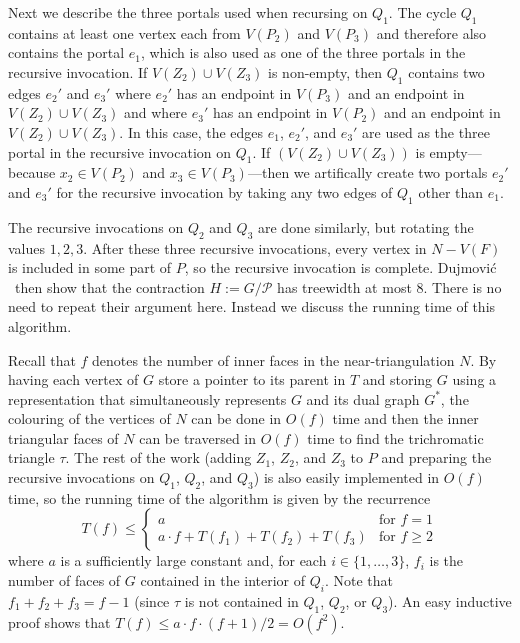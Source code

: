 \documentclass[kpfonts]{patmorin}
\let\le\leqslant
\let\ge\geqslant
\begin{document}
Next we describe the three portals used when recursing on $Q_1$.
The cycle $Q_1$ contains at least one vertex each from $V(P_2)$ and $V(P_3)$ and therefore also contains the portal $e_1$, which is also used as one of the three portals in the recursive invocation.  If $V(Z_2)\cup V(Z_3)$ is non-empty, then $Q_1$ contains two edges $e_2'$ and $e_3'$ where $e_2'$ has an endpoint in $V(P_3)$ and an endpoint in $V(Z_2)\cup V(Z_3)$ and where $e_3'$ has an endpoint in $V(P_2)$ and an endpoint in $V(Z_2)\cup V(Z_3)$.  In this case, the edges $e_1$, $e_2'$, and $e_3'$ are used as the three portal in the recursive invocation on $Q_1$.  If $(V(Z_2)\cup V(Z_3))$ is empty---because $x_2\in V(P_2)$ and $x_3\in V(P_3)$---then we artifically create two portals $e_2'$ and $e_3'$ for the recursive invocation by taking any two edges of $Q_1$ other than $e_1$.

The recursive invocations on $Q_2$ and $Q_3$ are done similarly, but rotating the values $1,2,3$.  After these three recursive invocations, every vertex in $N-V(F)$ is included in some part of $P$, so the recursive invocation is complete.  Dujmović \etal\  then show that the contraction $H:=G/\mathcal{P}$ has treewidth at most 8. There is no need to repeat their argument here.  Instead we discuss the running time of this algorithm.

Recall that $f$ denotes the number of inner faces in the near-triangulation $N$.  By having each vertex of $G$ store a pointer to its parent in $T$ and storing $G$ using a representation that simultaneously represents $G$ and its dual graph $G^*$, the colouring of the vertices of $N$ can be done in $O(f)$ time and then the inner triangular faces of $N$ can be traversed in $O(f)$ time to find the trichromatic triangle $\tau$. The rest of the work (adding $Z_1$, $Z_2$, and $Z_3$ to $P$ and preparing the recursive invocations on $Q_1$, $Q_2$, and $Q_3$) is also easily implemented in $O(f)$ time, so the running time of the algorithm is given by the recurrence
\[  T(f) \le \begin{cases}
           a & \text{for $f=1$} \\
           a\cdot f + T(f_1)+T(f_2)+T(f_3) & \text{for $f\ge 2$}
         \end{cases}
 \]
where $a$ is a sufficiently large constant and, for each $i\in\{1,\ldots,3\}$, $f_i$ is the number of faces of $G$ contained in the interior of $Q_i$.
Note that $f_1+f_2+f_3=f-1$ (since $\tau$ is not contained in $Q_1$, $Q_2$, or $Q_3$).  An easy inductive proof shows that $T(f) \le a\cdot f\cdot (f+1)/2 = O(f^2)$.
\end{document}
